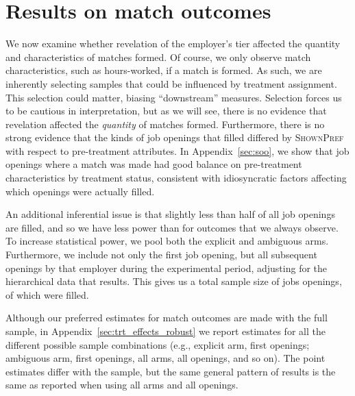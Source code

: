 \documentclass[12pt]{article}
\begin{document}

\section{Results on match outcomes} \label{sec:results_outcomes}

We now examine whether revelation of the employer's tier affected the quantity and characteristics of matches formed.
Of course, we only observe match characteristics, such as hours-worked, if a match is formed.
As such, we are inherently selecting samples that could be influenced by treatment assignment.
This selection could matter, biasing ``downstream'' measures.  
Selection forces us to be cautious in interpretation, but as we will see, there is no evidence that revelation affected the \emph{quantity} of matches formed.
Furthermore, there is no strong evidence that the kinds of job openings that filled differed by \textsc{ShownPref} with respect to pre-treatment attributes.
In Appendix~\ref{sec:soo}, we show that job openings where a match was made had good balance on pre-treatment characteristics by treatment status, consistent with idiosyncratic factors affecting which openings were actually filled. 

An additional inferential issue is that slightly less than half of all job openings are filled, and so we have less power than for outcomes that we always observe.
To increase statistical power, we pool both the explicit and ambiguous arms.
Furthermore, we include not only the first job opening, but all subsequent openings by that employer during the experimental period, adjusting for the hierarchical data that results.
This gives us a total sample size of \TotalSampleSize{} jobs openings, of which  \TotalFilledSampleSize{} were filled. 

Although our preferred estimates for match outcomes are made with the full sample, in Appendix~\ref{sec:trt_effects_robust} we report estimates for all the different possible sample combinations (e.g., explicit arm, first openings; ambiguous arm, first openings, all arms, all openings, and so on).
The point estimates differ with the sample, but the same general pattern of results is the same as reported when using all arms and all openings. 
\end{document}
